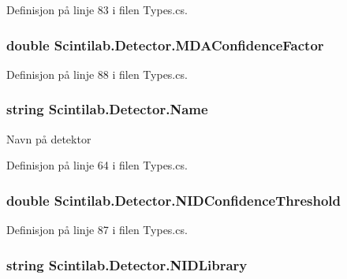Definisjon på linje 83 i filen Types.\+cs.

\hypertarget{class_scintilab_1_1_detector_ad50504bdff73cd41a3e5ba9baefbf968}{
\subsubsection[{M\+D\+A\+Confidence\+Factor}]{\setlength{\rightskip}{0pt plus 5cm}double Scintilab.\+Detector.\+M\+D\+A\+Confidence\+Factor}}\label{class_scintilab_1_1_detector_ad50504bdff73cd41a3e5ba9baefbf968}


Definisjon på linje 88 i filen Types.\+cs.

\hypertarget{class_scintilab_1_1_detector_aeddbda805641ca8d8f8aaa30aea2f3e0}{
\subsubsection[{Name}]{\setlength{\rightskip}{0pt plus 5cm}string Scintilab.\+Detector.\+Name}}\label{class_scintilab_1_1_detector_aeddbda805641ca8d8f8aaa30aea2f3e0}
Navn på detektor 

Definisjon på linje 64 i filen Types.\+cs.

\hypertarget{class_scintilab_1_1_detector_a44eef95ccfd5a66543e42d9e3f3dabd2}{
\subsubsection[{N\+I\+D\+Confidence\+Threshold}]{\setlength{\rightskip}{0pt plus 5cm}double Scintilab.\+Detector.\+N\+I\+D\+Confidence\+Threshold}}\label{class_scintilab_1_1_detector_a44eef95ccfd5a66543e42d9e3f3dabd2}


Definisjon på linje 87 i filen Types.\+cs.

\hypertarget{class_scintilab_1_1_detector_a707e92eaf7866c8f8559fae65d82a500}{
\subsubsection[{N\+I\+D\+Library}]{\setlength{\rightskip}{0pt plus 5cm}string Scintilab.\+Detector.\+N\+I\+D\+Library}}\label{class_scintilab_1_1_detector_a707e92eaf7866c8f8559fae65d82a500}


